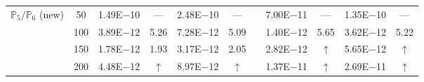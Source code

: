 \begin{table}[H]
{\begin{tabular}{@{}l c c c c c c c c c c@{}}
\midrule
\multirow{4}{*}{$\mathbb{P}_{5}/\mathbb{P}_{6}$ (new)}
 & 50 & 1.49E$-$10 & ---  & 2.48E$-$10 & --- &  & 7.00E$-$11 & --- & 1.35E$-$10 & ---\\
 & 100 & 3.89E$-$12 & 5.26  & 7.28E$-$12 & 5.09 &  & 1.40E$-$12 & 5.65 & 3.62E$-$12 & 5.22\\
 & 150 & 1.78E$-$12 & 1.93  & 3.17E$-$12 & 2.05 &  & 2.82E$-$12 & $\uparrow$ & 5.65E$-$12 & $\uparrow$\\
 & 200 & 4.48E$-$12 & $\uparrow$  & 8.97E$-$12 & $\uparrow$ &  & 1.37E$-$11 & $\uparrow$ & 2.69E$-$11 & $\uparrow$\\
\bottomrule
\end{tabular}}
\label{none}
\end{table}
